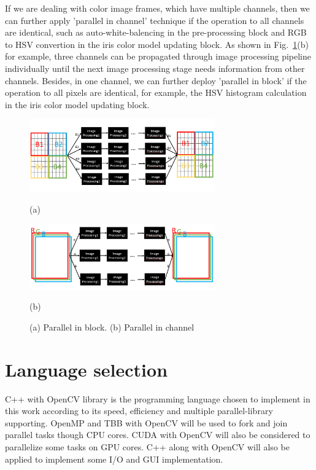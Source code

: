 \documentclass[sigconf]{acmart}
\begin{document}
If we are dealing with color image frames, which have multiple channels, then we can further apply 'parallel in channel' technique if the operation to all channels are identical, such as auto-white-balencing in the pre-processing block and RGB to HSV convertion in the iris color model updating block. As shown in Fig.~\ref{fig:parallelism_tiling}(b) for example, three channels can be propagated through image processing pipeline individually until the next image processing stage needs information from other channels. Besides, in one channel, we can further deploy 'parallel in block' if the operation to all pixels are identical, for example, the HSV histogram calculation in the iris color model updating block.

\begin{figure}[t]
\begin{minipage}[b]{0.8\linewidth}
  \centering
  \centerline{\includegraphics[width=8cm]{../Fig/Parallel_Tiling.png}}
  \centerline{(a)}\medskip
\end{minipage}
%
\vfill
\begin{minipage}[b]{0.8\linewidth}
  \centering
  \centerline{\includegraphics[width=8cm]{../Fig/Parallel_Tiling_Color.png}}
  \centerline{(b)}\medskip
\end{minipage}
\caption{(a) Parallel in block. (b) Parallel in channel}
\label{fig:parallelism_tiling}
\end{figure}


\section{Language selection}
C++ with OpenCV library is the programming language chosen to implement in this work according to its speed, efficiency and multiple parallel-library supporting. OpenMP and TBB with OpenCV will be used to fork and join parallel tasks though CPU cores. CUDA with OpenCV will also be considered to parallelize some tasks on GPU cores. C++ along with OpenCV will also be applied to implement some I/O and GUI implementation.
\end{document}
